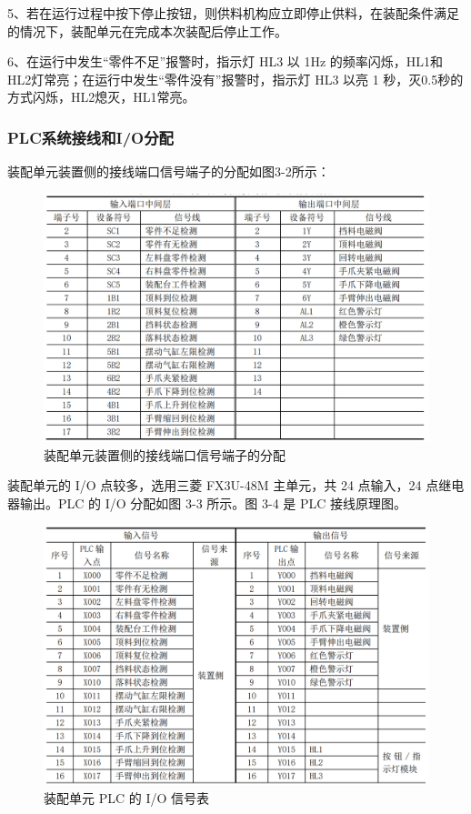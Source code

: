 \documentclass[12pt]{article}
\begin{document}
5、若在运行过程中按下停止按钮，则供料机构应立即停止供料，在装配条件满足的情况下，装配单元在完成本次装配后停止工作。

6、在运行中发生“零件不足”报警时，指示灯 HL3 以 1Hz 的频率闪烁，HL1和HL2灯常亮；在运行中发生“零件没有”报警时，指示灯 HL3 以亮 1 秒，灭0.5秒的方式闪烁，HL2熄灭，HL1常亮。 

\subsubsection{PLC系统接线和I/O分配}
装配单元装置侧的接线端口信号端子的分配如图3-2所示：

\begin{figure}[htbp]
    \centering
    \includegraphics[scale=0.8]{fig/信号端子.png}
    \caption{装配单元装置侧的接线端口信号端子的分配}
\end{figure} 

装配单元的 I/O 点较多，选用三菱 FX3U-48M 主单元，共 24 点输入，24 点继电器输出。PLC 的 I/O 分配如图 3-3 所示。图 3-4 是 PLC 接线原理图。

\begin{figure}[htbp]
    \centering
    \includegraphics[scale=0.6]{fig/PLCIO.png}
    \caption{装配单元 PLC 的 I/O 信号表}
\end{figure} 
\end{document}
